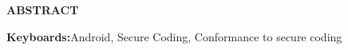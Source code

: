 \newpage
\thispagestyle{plain}

{\centering\bf ABSTRACT\\}\par\vskip 1cm



\doubleSpacing
 

\textbf{Keyboards:}Android, Secure Coding, Conformance to secure coding
\newpage



